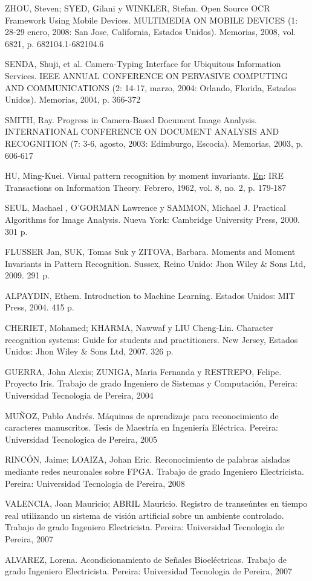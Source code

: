 \documentclass[a4paper, 12pt, oneside]{article}
\begin{document}
	ZHOU, Steven; SYED, Gilani y WINKLER, Stefan. Open Source OCR Framework Using Mobile Devices. MULTIMEDIA ON MOBILE DEVICES (1: 28-29 enero, 2008: San Jose, California, Estados Unidos). Memorias, 2008, vol. 6821, p. 682104.1-682104.6
	
	SENDA, Shuji, et al. Camera-Typing Interface for Ubiquitous Information Services. IEEE ANNUAL CONFERENCE ON PERVASIVE COMPUTING AND COMMUNICATIONS (2: 14-17, marzo, 2004: Orlando, Florida, Estados Unidos). Memorias, 2004, p. 366-372
	
	SMITH, Ray. Progress in Camera-Based Document Image Analysis. INTERNATIONAL CONFERENCE ON DOCUMENT ANALYSIS AND RECOGNITION (7: 3-6, agosto, 2003: Edimburgo, Escocia). Memorias, 2003, p. 606-617
	
	HU, Ming-Kuei. Visual pattern recognition by moment invariants. \underline{En}: IRE Transactions on Information Theory. Febrero, 1962, vol. 8, no. 2, p. 179-187
	
	SEUL, Machael , O'GORMAN Lawrence y SAMMON, Michael J. Practical Algorithms for Image Analysis. Nueva York: Cambridge University Press, 2000. 301 p.
	
	FLUSSER Jan, SUK, Tomas Suk y ZITOVA, Barbara. Moments and Moment Invariants in Pattern Recognition. Sussex, Reino Unido: Jhon Wiley \& Sons Ltd, 2009. 291 p.
	
	ALPAYDIN, Ethem. Introduction to Machine Learning. Estados Unidos: MIT Press, 2004. 415 p.
	
	CHERIET, Mohamed; KHARMA, Nawwaf y LIU Cheng-Lin. Character recognition systems: Guide for students and practitioners. New Jersey, Estados Unidos: Jhon Wiley \& Sons Ltd, 2007. 326 p.
	
	GUERRA, John Alexis; ZUNIGA, Maria Fernanda y RESTREPO, Felipe. Proyecto Iris. Trabajo de grado Ingeniero de Sistemas y Computación, Pereira: Universidad Tecnologia de Pereira, 2004
	
	MUÑOZ, Pablo Andrés. Máquinas de aprendizaje para reconocimiento de caracteres manuscritos. Tesis de Maestría en Ingeniería Eléctrica. Pereira: Universidad Tecnologica de Pereira, 2005
	
	RINCÓN, Jaime; LOAIZA, Johan Eric. Reconocimiento de palabras aisladas mediante redes neuronales sobre FPGA. Trabajo de grado Ingeniero Electricista. Pereira: Universidad Tecnologia de Pereira, 2008
	
	VALENCIA, Joan Mauricio; ABRIL Mauricio. Registro de transeúntes en tiempo real utilizando un sistema de visión artificial sobre un ambiente controlado. Trabajo de grado Ingeniero Electricista. Pereira: Universidad Tecnologia de Pereira, 2007
	
	ALVAREZ, Lorena. Acondicionamiento de Señales Bioeléctricas. Trabajo de grado Ingeniero Electricista. Pereira: Universidad Tecnologia de Pereira, 2007
	
	\clearpage
\end{document}
